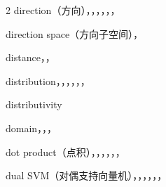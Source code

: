 \begin{multicols}{2}
\noindent direction（方向），，，，，，\par
\noindent direction space（方向子空间），\par
\noindent distance，，\par
\noindent distribution，，，，，，\par
\noindent distributivity\par
\noindent domain，，，\par
\noindent dot product（点积），，，，，，\par
\noindent dual SVM（对偶支持向量机），，，，，，\par


\end{multicols}
